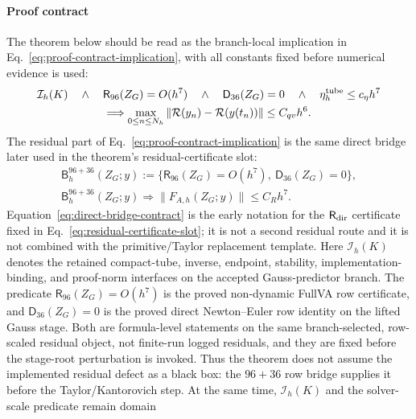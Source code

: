 \documentclass[preprint,12pt]{elsarticle}
\begin{document}
\paragraph{Proof contract}
The theorem below should be read as the branch-local implication in
Eq.~\eqref{eq:proof-contract-implication}, with all constants fixed before
numerical evidence is used:
\begin{equation}
\label{eq:proof-contract-implication}
\begin{gathered}
  \mathcal I_h(K)
  \quad\wedge\quad
  \mathsf R_{96}(Z_G)=O(h^7)
  \quad\wedge\quad
  \mathsf D_{36}(Z_G)=0
  \quad\wedge\quad
  \eta_h^{\rm tube}\le c_\eta h^7 \\
  \Longrightarrow
  \max_{0\le n\le N_h}
  \|{\mathcal R}(y_n)-{\mathcal R}(y(t_n))\|
  \le C_{qv}h^6 .
\end{gathered}
\end{equation}
The residual part of Eq.~\eqref{eq:proof-contract-implication} is the
same direct bridge later used in the theorem's residual-certificate slot:
\begin{equation}
\label{eq:direct-bridge-contract}
\begin{gathered}
  \mathsf B_h^{96+36}(Z_G;y)
  :=
  \bigl\{\mathsf R_{96}(Z_G)=O(h^7),\ 
  \mathsf D_{36}(Z_G)=0\bigr\},\\
  \mathsf B_h^{96+36}(Z_G;y)
  \Longrightarrow
  \|F_{A,h}(Z_G;y)\|\le C_Rh^7 .
\end{gathered}
\end{equation}
Equation~\eqref{eq:direct-bridge-contract} is the early notation for the
\(\mathsf R_{\rm dir}\) certificate fixed in
Eq.~\eqref{eq:residual-certificate-slot}; it is not a second residual route
and it is not combined with the primitive/Taylor replacement template.
Here \(\mathcal I_h(K)\) denotes the retained compact-tube, inverse,
endpoint, stability, implementation-binding, and proof-norm interfaces on the
accepted Gauss-predictor branch.  The predicate
\(\mathsf R_{96}(Z_G)=O(h^7)\) is the proved non-dynamic FullVA row
certificate, and \(\mathsf D_{36}(Z_G)=0\) is the proved direct
Newton--Euler row identity on the lifted Gauss stage.  Both are formula-level
statements on the same branch-selected, row-scaled residual object, not
finite-run logged residuals, and they are fixed before the stage-root
perturbation is invoked.  Thus the theorem does
not assume the implemented residual defect as a black box: the
\(96+36\) row bridge supplies it before the Taylor/Kantorovich step.  At the
same time, \(\mathcal I_h(K)\) and the solver-scale predicate remain domain
\end{document}
